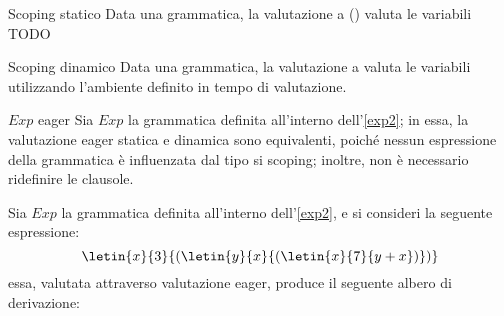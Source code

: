 \documentclass[a4paper, 12pt]{report}
\begin{document}
    \begin{frameddefn}{Scoping statico}
        Data una grammatica, la valutazione a  () valuta le variabili TODO
    \end{frameddefn}

    \begin{frameddefn}{Scoping dinamico}
        Data una grammatica, la valutazione a  valuta le variabili utilizzando l'ambiente definito in tempo di valutazione.
    \end{frameddefn}

    \begin{framedobs}{$Exp$ eager}
        Sia $Exp$ la grammatica definita all'interno dell'\cref{exp2}; in essa, la valutazione eager statica e dinamica sono equivalenti, poiché nessun espressione della grammatica è influenzata dal tipo si scoping; inoltre, non è necessario ridefinire le clausole.
    \end{framedobs}

    \begin{example}
        \label{eager2}
        Sia $Exp$ la grammatica definita all'interno dell'\cref{exp2}, e si consideri la seguente espressione: $$\letin{x}{3}{(\letin{y}{x}{(\letin{x}{7}{y + x})})}$$ essa, valutata attraverso valutazione eager, produce il seguente albero di derivazione: 
    \end{example}
\end{document}
